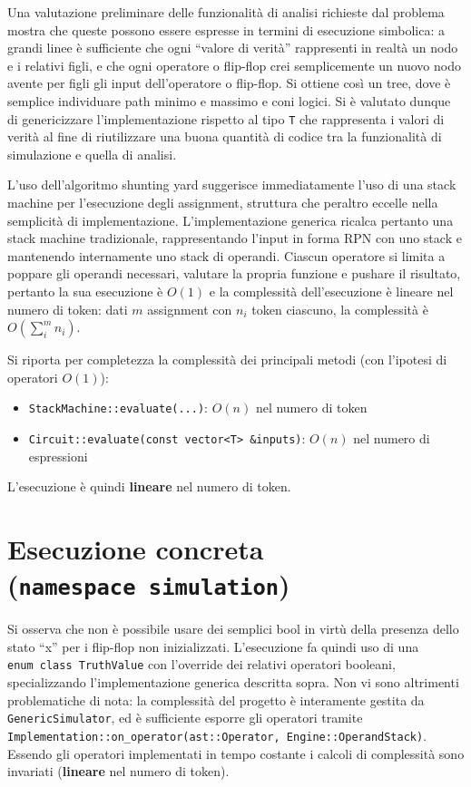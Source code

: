 \documentclass[12pt]{article}
\begin{document}
Una valutazione preliminare delle funzionalità di analisi richieste dal
problema mostra che queste possono essere espresse in termini di
esecuzione simbolica: a grandi linee è sufficiente che ogni ``valore di
verità'' rappresenti in realtà un nodo e i relativi figli, e che ogni
operatore o flip-flop crei semplicemente un nuovo nodo avente per figli
gli input dell'operatore o flip-flop. Si ottiene così un tree, dove è
semplice individuare path minimo e massimo e coni logici. Si è valutato
dunque di genericizzare l'implementazione rispetto al tipo \texttt{T}
che rappresenta i valori di verità al fine di riutilizzare una buona
quantità di codice tra la funzionalità di simulazione e quella di
analisi.

L'uso dell'algoritmo shunting yard suggerisce immediatamente l'uso di
una stack machine per l'esecuzione degli assignment, struttura che
peraltro eccelle nella semplicità di implementazione. L'implementazione
generica ricalca pertanto una stack machine tradizionale, rappresentando
l'input in forma RPN con uno stack e mantenendo internamente uno stack
di operandi. Ciascun operatore si limita a poppare gli operandi
necessari, valutare la propria funzione e pushare il risultato, pertanto
la sua esecuzione è \(O(1)\) e la complessità dell'esecuzione è lineare
nel numero di token: dati \(m\) assignment con \(n_i\) token ciascuno,
la complessità è \(O(\sum_i^m n_i)\).

Si riporta per completezza la complessità dei principali metodi (con
l'ipotesi di operatori \(O(1)\)):

\begin{itemize}
\item
  \texttt{StackMachine::evaluate(...)}: \(O(n)\) nel numero di token
\item
  \texttt{Circuit::evaluate(const\ vector\textless{}T\textgreater{}\ \&inputs)}:
  \(O(n)\) nel numero di espressioni
\end{itemize}

L'esecuzione è quindi \textbf{lineare} nel numero di token.

\section{Esecuzione concreta (\texttt{namespace\ simulation})}

Si osserva che non è possibile usare dei semplici bool in virtù della
presenza dello stato ``x'' per i flip-flop non inizializzati.
L'esecuzione fa quindi uso di una \texttt{enum\ class\ TruthValue} con
l'override dei relativi operatori booleani, specializzando
l'implementazione generica descritta sopra. Non vi sono altrimenti
problematiche di nota: la complessità del progetto è interamente gestita
da \texttt{GenericSimulator}, ed è sufficiente esporre gli operatori
tramite
\texttt{Implementation::on\_operator(ast::Operator,\ Engine::OperandStack)}.
Essendo gli operatori implementati in tempo costante i calcoli di
complessità sono invariati (\textbf{lineare} nel numero di token).
\end{document}
